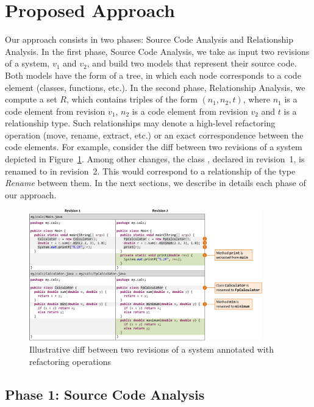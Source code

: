\section{Proposed Approach}

Our approach consists in two phases: Source Code Analysis and Relationship Analysis.
In the first phase, Source Code Analysis, we take as input two revisions of a system, $v_1$ and $v_2$, and build two models that represent their source code.
Both models have the form of a tree, in which each node corresponds to a code element (classes, functions, etc.).
In the second phase, Relationship Analysis, we compute a set $R$, which contains triples of the form $(n_1, n_2, t)$, where $n_1$ is a code element from revision $v_1$, $n_2$ is a code element from revision $v_2$ and $t$ is a relationship type.
Such relationships may denote a high-level refactoring operation (move, rename, extract, etc.) or an exact correspondence between the code elements.
For example, consider the diff between two revisions of a system depicted in Figure~\ref{FigDiff1}.
Among other changes, the class , declared in revision~1, is renamed to  in revision~2. This would correspond to a relationship of the type \emph{Rename} between them.
In the next sections, we describe in details each phase of our approach.

\begin{figure}[htb]
\centering
\includegraphics[width=0.9\textwidth]{img/diff1.pdf}
\caption{Illustrative diff between two revisions of a system annotated with refactoring operations}
\label{FigDiff1}
\end{figure}


\subsection{Phase 1: Source Code Analysis}

